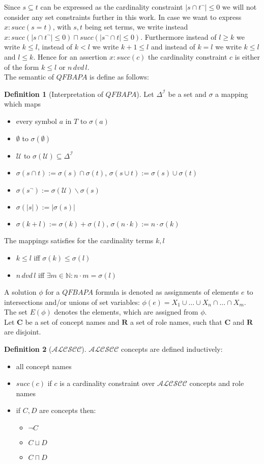 \documentclass[a4paper,11pt]{scrartcl}
\theoremstyle{break}
\theoremstyle{definition}
\newtheorem{mydef}{Definition}
\begin{document}
Since $s\subseteq t$ can be expressed as the cardinality constraint $|s\cap t^\neg|\leq 0$ we will not consider any set constraints further in this work. In case we want to express $x:succ(s=t)$, with $s,t$ being set terms, we write instead $x:succ(|s\cap t^\neg|\leq 0)\sqcap succ(|s^\neg\cap t|\leq 0)$. Furthermore instead of $l\geq k$ we write $k\leq l$, instead of $k<l$ we write $k+1\leq l$ and instead of $k=l$ we write $k\leq l$ and $l\leq k$. Hence for an assertion $x:succ(c)$ the cardinality constraint $c$ is either of the form $k\leq l$ or $n\,dvd\,l$.\\
The semantic of $QFBAPA$ is define as follows:
\begin{mydef}[Interpretation of $QFBAPA$]
Let $\Delta^\mathcal{I}$ be a set and $\sigma$ a mapping which maps
\begin{itemize}
\item every symbol $a$ in $T$ to $\sigma(a)$
\item $\emptyset$ to $\sigma(\emptyset)$
\item $\mathcal{U}$ to $\sigma(\mathcal{U})\subseteq \Delta^\mathcal{I}$
\item $\sigma(s\cap t):= \sigma(s)\cap \sigma(t)$, $\sigma(s\cup t):= \sigma(s)\cup \sigma(t)$
\item $\sigma(s^\neg):=\sigma(\mathcal{U})\backslash \sigma(s)$
\item $\sigma(|s|):=|\sigma(s)|$
\item $\sigma(k+l):=\sigma(k)+\sigma(l)$, $\sigma(n\cdot k):= n\cdot \sigma(k)$
\end{itemize}
The mappings satisfies for the cardinality terms $k,l$
\begin{itemize}
\item $k\leq l$ iff $\sigma(k)\leq \sigma(l)$
\item $n\,dvd\,l$ iff $\exists m\in\mathbb{N}:n\cdot m = \sigma(l)$
\end{itemize}
\end{mydef}
A solution $\phi$ for a $QFBAPA$ formula is denoted as assignments of elements $e$ to intersections and/or unions of set variables: $\phi(e)=X_1\cup\dots\cup X_n\cap\dots\cap X_m$. The set $E(\phi)$ denotes the elements, which are assigned from $\phi$.\\
Let $\mathbf{C}$ be a set of concept names and $\mathbf{R}$ a set of role names, such that $\mathbf{C}$ and $\mathbf{R}$ are disjoint.
\begin{mydef}[$\mathcal{ALCSCC}$]
$\mathcal{ALCSCC}$ concepts are defined inductively:
\begin{itemize}
\item all concept names
\item $succ(c)$ if $c$ is a cardinality constraint over $\mathcal{ALCSCC}$ concepts and role names
\item if $C,D$ are concepts then:
\begin{itemize}
\item $\neg C$
\item $C\sqcup D$
\item $C\sqcap D$
\end{itemize}
\end{itemize}
\end{mydef}
\end{document}
